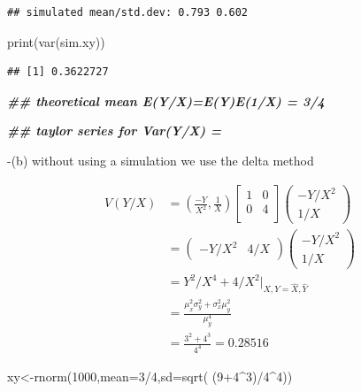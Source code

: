 \documentclass[
]{book}
\newenvironment{Shaded}{\begin{snugshade}}{\end{snugshade}}
\newcommand{\AttributeTok}[1]{\textcolor[rgb]{0.77,0.63,0.00}{#1}}
\newcommand{\DecValTok}[1]{\textcolor[rgb]{0.00,0.00,0.81}{#1}}
\newcommand{\DocumentationTok}[1]{\textcolor[rgb]{0.56,0.35,0.01}{\textbf{\textit{#1}}}}
\newcommand{\FunctionTok}[1]{\textcolor[rgb]{0.00,0.00,0.00}{#1}}
\newcommand{\NormalTok}[1]{#1}
\newcommand{\OtherTok}[1]{\textcolor[rgb]{0.56,0.35,0.01}{#1}}
\newcommand{\SpecialCharTok}[1]{\textcolor[rgb]{0.00,0.00,0.00}{#1}}
\theoremstyle{definition}
\theoremstyle{definition}
\theoremstyle{definition}
\theoremstyle{definition}
\theoremstyle{remark}
\begin{document}
\begin{verbatim}
## simulated mean/std.dev: 0.793 0.602
\end{verbatim}

\begin{Shaded}
\begin{Highlighting}[]
 \FunctionTok{print}\NormalTok{(}\FunctionTok{var}\NormalTok{(sim.xy))}
\end{Highlighting}
\end{Shaded}

\begin{verbatim}
## [1] 0.3622727
\end{verbatim}

\begin{Shaded}
\begin{Highlighting}[]
 \DocumentationTok{\#\# theoretical mean  E(Y/X)=E(Y)E(1/X) = 3/4}
 
 \DocumentationTok{\#\# taylor series for Var(Y/X) = }
\end{Highlighting}
\end{Shaded}

-(b) without using a simulation we use the delta method

\[
\begin{aligned}
V(Y/X)&=(\frac{-Y}{X^2},\frac{1}{X})\begin{bmatrix} 1 & 0\\
0 & 4\\
\end{bmatrix}\begin{pmatrix} -Y/X^2 \\ 1/X \end{pmatrix}\\
&=\begin{pmatrix} -Y/X^2 & 4/X \end{pmatrix}\begin{pmatrix} -Y/X^2 \\ 1/X \end{pmatrix}\\
&= Y^2/X^4 +4/X^2 |_{X,Y=\hat{X},\hat{Y}} \\
&= \frac{\mu_x^2\sigma_y^2 +\sigma_x^2\mu_y^2}{\mu_y^4}\\
&= \frac{3^2+4^3}{4^4} = 0.28516
\end{aligned}
\]

\begin{Shaded}
\begin{Highlighting}[]
\NormalTok{  xy}\OtherTok{\textless{}{-}}\FunctionTok{rnorm}\NormalTok{(}\DecValTok{1000}\NormalTok{,}\AttributeTok{mean=}\DecValTok{3}\SpecialCharTok{/}\DecValTok{4}\NormalTok{,}\AttributeTok{sd=}\FunctionTok{sqrt}\NormalTok{( (}\DecValTok{9}\SpecialCharTok{+}\DecValTok{4}\SpecialCharTok{\^{}}\DecValTok{3}\NormalTok{)}\SpecialCharTok{/}\DecValTok{4}\SpecialCharTok{\^{}}\DecValTok{4}\NormalTok{))}
\end{Highlighting}
\end{Shaded}
\end{document}
